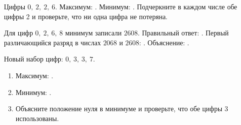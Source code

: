 \begin{practicebox}
  Цифры \(0,\ 2,\ 2,\ 6\). Максимум: \answerblank[34mm]. Минимум:
  \answerblank[34mm]. Подчеркните в каждом числе обе цифры 2 и проверьте, что
  ни одна цифра не потеряна.
\end{practicebox}

\begin{warningbox}
  Для цифр \(0,\ 2,\ 6,\ 8\) минимум записали \(2608\). Правильный ответ:
  \answerblank[34mm]. Первый различающийся разряд в числах \(2068\) и
  \(2608\): \answerblank[24mm]. Объяснение: \answerblank[62mm].
\end{warningbox}

\begin{checkpointbox}
  Новый набор цифр: \(0,\ 3,\ 3,\ 7\).
  \begin{enumerate}[label=\textbf{\arabic*.}]
    \item Максимум: \answerblank[34mm].
    \item Минимум: \answerblank[34mm].
    \item Объясните положение нуля в минимуме и проверьте, что обе цифры \(3\)
      использованы.
  \end{enumerate}
\end{checkpointbox}
